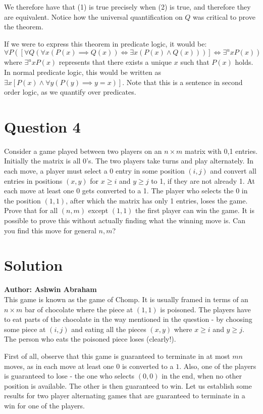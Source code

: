 \documentclass[12pt]{report}
\begin{document}
We therefore have that (1) is true precisely when (2) is true, and therefore they are equivalent. Notice how the universal quantification on $Q$ was critical to prove the theorem.

If we were to express this theorem in predicate logic, it would be:
\begin{equation*}
  \forall P (\left[\forall Q (\forall x (P(x) \implies Q(x)) \iff \exists x (P(x) \land Q(x)))\right] \iff \exists^{u} x P(x))
\end{equation*}
where $\exists^{u} x P(x)$ represents that there exists a unique $x$ such that $P(x)$ holds. In normal predicate logic, this would be written as $\exists x \left[P(x) \land \forall y (P(y) \implies y = x)\right]$. Note that this is a sentence in second order logic, as we quantify over predicates.
\section*{Question 4}
Consider a game played between two players on an $n \times m$ matrix with 0,1 entries. Initially the matrix is all 0's. The two players take turns and play alternately. In each move, a player must select a 0 entry in some position $(i, j)$ and convert all entries in positions $(x, y)$ for $x \geq i$ and $y \geq j$ to 1, if they are not already 1. At each move at least one 0 gets converted to a 1.
The player who selects the 0 in the position $(1, 1)$, after which the matrix has only 1 entries, loses the game. Prove that for all $(n, m)$ except $(1, 1)$ the first player can win the game. It is possible to prove this without actually finding what the winning move is. Can you find this move for general $n, m$?
\section*{Solution}
\textbf{Author: Ashwin Abraham}\\
This game is known as the game of Chomp. It is usually framed in terms of an $n \times m$ bar of chocolate where the piece at $(1, 1)$ is poisoned. The players have to eat parts of the chocolate in the way mentioned in the question - by choosing some piece at $(i, j)$ and eating all the pieces $(x, y)$ where $x \geq i$ and $y \geq j$. The person who eats the poisoned piece loses (clearly!). 

First of all, observe that this game is guaranteed to terminate in at most $mn$ moves, as in each move at least one $0$ is converted to a $1$. Also, one of the players is guaranteed to lose - the one who selects $(0, 0)$ in the end, when no other position is available. The other is then guaranteed to win. Let us establish some results for two player alternating games that are guaranteed to terminate in a win for one of the players. 
\end{document}
